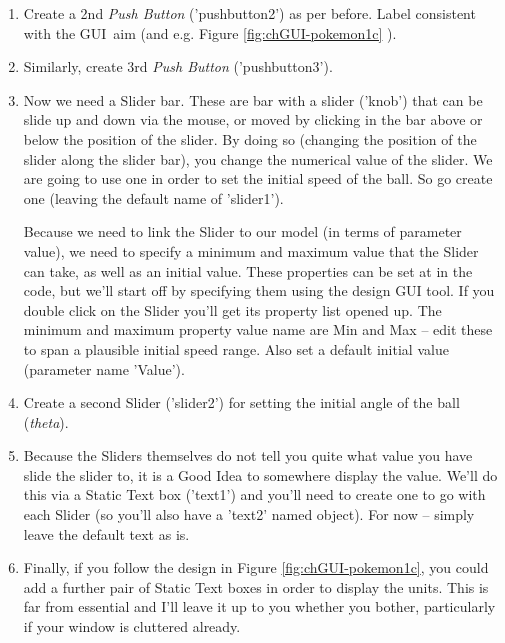 \documentclass{tufte-book} %
\begin{document}
\begin{enumerate}
\item Create a 2nd \textit{Push Button} ('\textsf{pushbutton}2') as per before. Label consistent with the GUI\ aim (and e.g. Figure \ref{fig:chGUI-pokemon1c} ).

\item Similarly, create 3rd \textit{Push Button} ('\textsf{pushbutton}3').

\item Now we need a \textsf{Slider} bar. These are bar with a slider ('knob') that can be slide up and down via the mouse, or moved by clicking in the bar above or below the position of the slider. By doing so (changing the position of the slider along the slider bar), you change the numerical value of the slider. We are going to use one in order to set the initial speed of the ball. So go create one (leaving the default name of '\textsf{slider1}').

Because we need to link the \textsf{Slider} to our model (in terms of parameter value), we need to specify a minimum and maximum value that the \textsf{Slider} can take, as well as an initial value. These properties can be set at in the code, but we'll start off by specifying them using the design GUI tool. If you double click on the \textsf{Slider} you'll get its property list opened up. The minimum and maximum property value name are \textsf{Min} and \textsf{Max} -- edit these to span a plausible initial speed range. Also set a default initial value (parameter name '\textsf{Value}').

\item Create a second \textsf{Slider} ('\textsf{slider2}') for setting the initial angle of the ball (\textit{theta}).

\item Because the \textsf{Sliders} themselves do not tell you quite what value you have slide the slider to, it is a Good Idea to somewhere display the value. We'll do this via a \textsf{Static Text} box ('\textsf{text1}') and you'll need to create one to go with each \textsf{Slider} (so you'll also have a '\textsf{text2}' named object). For now -- simply leave the default text as is.

\item Finally, if you follow the design in Figure \ref{fig:chGUI-pokemon1c}, you could add a further pair of \textsf{Static Text} boxes in order to display the units. This is far from essential and I'll leave it up to you whether you bother, particularly if your window is cluttered already. 

\end{enumerate}
\end{document}
